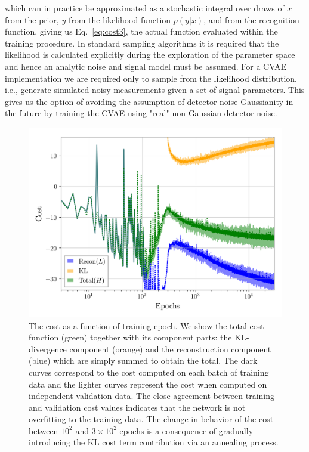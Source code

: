 \documentclass[%
showpacs,
nofootinbib,
 amsmath,amssymb,
 aps,
 twocolumn,
 prl,
 reprint,
floatfix,
]{revtex4-1}
\begin{document}
%
which can in practice be approximated as a stochastic integral over draws of
$x$ from the prior, $y$ from the likelihood function $p(y|x)$, and from the
recognition function, giving us Eq.~\ref{eq:cost3}, the actual function
evaluated within the training procedure. In standard sampling algorithms it is
required that the likelihood is calculated explicitly during the exploration of
the parameter space and hence an analytic noise and signal model must be
assumed. For a \ac{CVAE} implementation we are required only to sample from
the likelihood distribution, i.e., generate simulated noisy measurements given a
set of signal parameters. This gives us the option of avoiding the assumption
of detector noise Gaussianity in the future by training the \ac{CVAE} using "real"
non-Gaussian detector noise.

%
%
\begin{figure}
    \includegraphics[width=\columnwidth]{inv_losses_log.png}
\caption{\label{fig:loss_log} The cost as a function of training epoch.
We show the total cost function (green) together with its component parts:
the \ac{KL}-divergence component (orange) and the reconstruction component
(blue) which are simply summed to obtain the total. The dark curves correspond
to the cost computed on each batch of training data and the lighter curves
represent the cost when computed on independent validation data. The close
agreement between training and validation cost values indicates that the
network is not overfitting to the training data. The change in behavior of the
cost between $10^2$ and $3\times10^2$ epochs is a consequence of gradually
introducing the \ac{KL} cost term contribution via an annealing process.} 
\end{figure}
\end{document}
